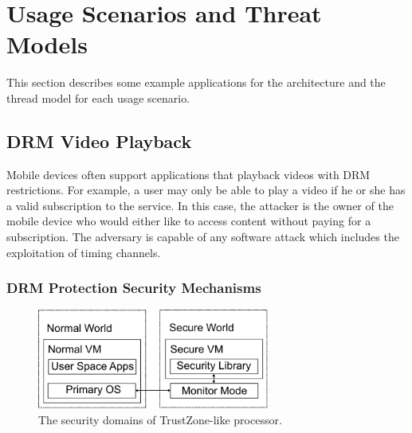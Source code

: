 \section{Usage Scenarios and Threat Models}

    This section describes some example applications for the architecture and 
    the thread model for each usage scenario.

    \subsection{DRM Video Playback}
    Mobile devices often support applications that playback videos with
    DRM restrictions. For example, a user may only be able to play a video if 
    he or she has a valid subscription to the service. In this case, the 
    attacker is the owner of the mobile device who would either like to access 
    content without paying for a subscription. The adversary is capable of any 
    software attack which includes the exploitation of timing channels.

    \subsubsection{DRM Protection Security Mechanisms}

    \begin{figure}
        \begin{center}
            \includegraphics[width=3in]{figs/worlds.pdf}
            \caption{The security domains of TrustZone-like processor.}
            \label{fig:tz_domains}
        \end{center}
    \end{figure}
   
